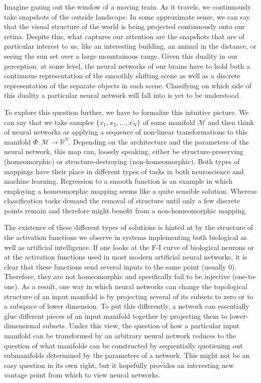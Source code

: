 Imagine gazing out the window of a moving train. As it travels, we continuously take snapshots of the outside landscape. In some approximate sense, we can say that the visual structure of the world is being projected continuously onto our retina. Despite this, what captures our attention are the snapshots that are of particular interest to us, like an interesting building, an animal in the distance, or seeing the sun set over a large mountainous range. Given this duality in our perception, at some level, the neural networks of our brains have to hold both a continuous representation of the smoothly shifting scene as well as a discrete representation of the separate objects in each scene. Classifying on which side of this duality a particular neural network will fall into is yet to be understood.

To explore this question further, we have to formalize this intuitive picture. We can say that we take samples $\{x_1,x_2,...,x_N\}$ of some manifold $\mathcal{M}$ and then think of neural networks as applying a sequence of non-linear transformations to this manifold $\Phi:\mathcal{M} \to \mathbb{R}^N$. Depending on the architecture and the parameters of the neural network, this map can, loosely speaking, either be structure-preserving (homeomorphic) or structure-destroying (non-homeomorphic). Both types of mappings have their place in different types of tasks in both neuroscience and machine learning. Regression to a smooth function is an example in which employing a homeomorphic mapping seems like a quite sensible solution. Whereas classification tasks demand the removal of structure until only a few discrete points remain and therefore might benefit from a non-homeomorphic mapping.

The existence of these different types of solutions is hinted at by the structure of the activation functions we observe in systems implementing both biological as well as artificial intelligence. If one looks at the F-I curve of biological neurons \cite{izhikevich2007dynamical} or at the activation functions used in most modern artificial neural networks, it is clear that these functions send several inputs to the same point (usually 0). Therefore, they are not homeomorphic and specifically fail to be injective (one-to-one). As a result, one way in which neural networks can change the topological structure of an input manifold is by projecting several of its subsets to zero or to a subspace of lower dimension. To put this differently, a network can essentially glue different pieces of an input manifold together by projecting them to lower-dimensional subsets. Under this view, the question of how a particular input manifold can be transformed by an arbitrary neural network reduces to the question of what manifolds can be constructed by sequentially quotiening out submanifolds determined by the parameters of a network. This might not be an easy question in its own right, but it hopefully provides an interesting new vantage point from which to view neural networks.

